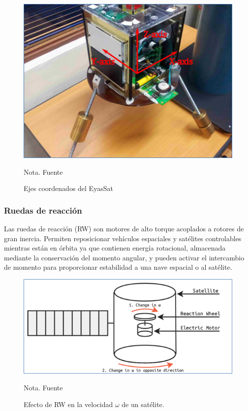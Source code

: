 \begin{figure}[!ht]
	\begin{center}
		\includegraphics[scale=0.9]{imagenes/marco_teorico/eyassat_axes.PNG}\\
	\end{center}
	\caption{ Ejes coordenados del EyasSat}
	\label{fig:eyassat_axes}
	\footnotesize{Nota. Fuente \cite{Groenewald2014}}
\end{figure}


\subsubsection{Ruedas de reacción}

Las ruedas de reacción (RW) son motores de alto torque acoplados a rotores de gran inercia. Permiten reposicionar vehículos espaciales y satélites controlables mientras están en órbita ya que contienen energía rotacional, almacenada mediante la conservación del momento angular, y pueden activar el intercambio de momento para proporcionar estabilidad a una nave espacial o al satélite.


\begin{figure}[!ht]
	\begin{center}
		\includegraphics[scale=0.9]{imagenes/marco_teorico/rw.PNG}\\
	\end{center}
	\caption{ Efecto de RW en la velocidad $\omega$ de un satélite.}
	\label{fig:rw_diagram}
	\footnotesize{Nota. Fuente \cite{opc:Charles2019}}
\end{figure}

